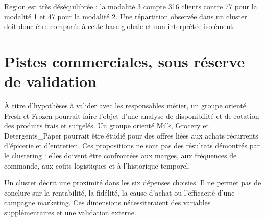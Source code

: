 Region est très déséquilibrée : la modalité 3 compte 316 clients contre 77 pour la modalité 1 et 47 pour la modalité 2. Une répartition observée dans un cluster doit donc être comparée à cette base globale et non interprétée isolément.

\section{Pistes commerciales, sous réserve de validation}
À titre d'hypothèses à valider avec les responsables métier, un groupe orienté Fresh et Frozen pourrait faire l'objet d'une analyse de disponibilité et de rotation des produits frais et surgelés. Un groupe orienté Milk, Grocery et Detergents\_Paper pourrait être étudié pour des offres liées aux achats récurrents d'épicerie et d'entretien. Ces propositions ne sont pas des résultats démontrés par le clustering : elles doivent être confrontées aux marges, aux fréquences de commande, aux coûts logistiques et à l'historique temporel.

\begin{precaution}
Un cluster décrit une proximité dans les six dépenses choisies. Il ne permet pas de conclure sur la rentabilité, la fidélité, la cause d'achat ou l'efficacité d'une campagne marketing. Ces dimensions nécessiteraient des variables supplémentaires et une validation externe.
\end{precaution}

